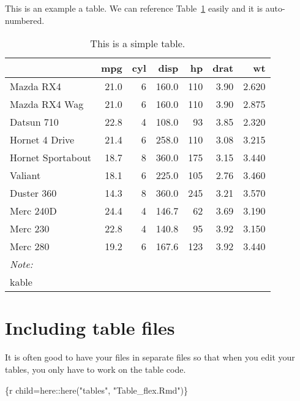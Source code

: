 \documentclass[
  letterpaper,
  oneside]{scrbook}
\newenvironment{Shaded}{\begin{snugshade}}{\end{snugshade}}
\newcommand{\InformationTok}[1]{\textcolor[rgb]{0.37,0.37,0.37}{#1}}
\begin{document}
This is an example a table. We can reference Table~\ref{tbl-example}
easily and it is auto-numbered.

\hypertarget{tbl-example}{}
\begin{table}
\caption{\label{tbl-example}This is a simple table. }\tabularnewline

\centering
\begin{tabular}[t]{lrrrrrr}
\toprule
  & mpg & cyl & disp & hp & drat & wt\\
\midrule
Mazda RX4 & 21.0 & 6 & 160.0 & 110 & 3.90 & 2.620\\
Mazda RX4 Wag & 21.0 & 6 & 160.0 & 110 & 3.90 & 2.875\\
Datsun 710 & 22.8 & 4 & 108.0 & 93 & 3.85 & 2.320\\
Hornet 4 Drive & 21.4 & 6 & 258.0 & 110 & 3.08 & 3.215\\
Hornet Sportabout & 18.7 & 8 & 360.0 & 175 & 3.15 & 3.440\\
\addlinespace
Valiant & 18.1 & 6 & 225.0 & 105 & 2.76 & 3.460\\
Duster 360 & 14.3 & 8 & 360.0 & 245 & 3.21 & 3.570\\
Merc 240D & 24.4 & 4 & 146.7 & 62 & 3.69 & 3.190\\
Merc 230 & 22.8 & 4 & 140.8 & 95 & 3.92 & 3.150\\
Merc 280 & 19.2 & 6 & 167.6 & 123 & 3.92 & 3.440\\
\bottomrule
\multicolumn{7}{l}{\rule{0pt}{1em}\textit{Note: }}\\
\multicolumn{7}{l}{\rule{0pt}{1em}kable}\\
\end{tabular}
\end{table}

\hypertarget{including-table-files}{%
\section{Including table files}\label{including-table-files}}

It is often good to have your files in separate files so that when you
edit your tables, you only have to work on the table code.

\begin{Shaded}
\begin{Highlighting}[]
\InformationTok{\textasciigrave{}\textasciigrave{}\textasciigrave{}\{r child=here::here("tables", "Table\_flex.Rmd")\}}
\InformationTok{\textasciigrave{}\textasciigrave{}\textasciigrave{}}
\end{Highlighting}
\end{Shaded}
\end{document}
